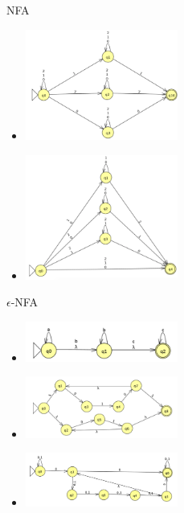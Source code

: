 \documentclass[a4paper,11pt]{article}
\begin{document}
    NFA
    \begin{itemize}
        \item \begin{minipage}{\linewidth}
            \centering
            \includegraphics[width=5cm]{SolNFA2.png}
        \end{minipage}   
        \item \begin{minipage}{\linewidth}
            \centering
            \includegraphics[width=5cm]{SolNFA3.png}
        \end{minipage}   
    \end{itemize}
    \begin{math}\epsilon
    \end{math}-NFA
    \begin{itemize}
        \item \begin{minipage}{\linewidth}
            \centering
            \includegraphics[width=5cm]{SolEPS1.png}
        \end{minipage}
        \item \begin{minipage}{\linewidth}
            \centering
            \includegraphics[width=5cm]{SolEPS2.png}
        \end{minipage}  
        \item \begin{minipage}{\linewidth}
            \centering
            \includegraphics[width=5cm]{SolEPS3.png}
        \end{minipage}  
    \end{itemize}
    
\end{document}
